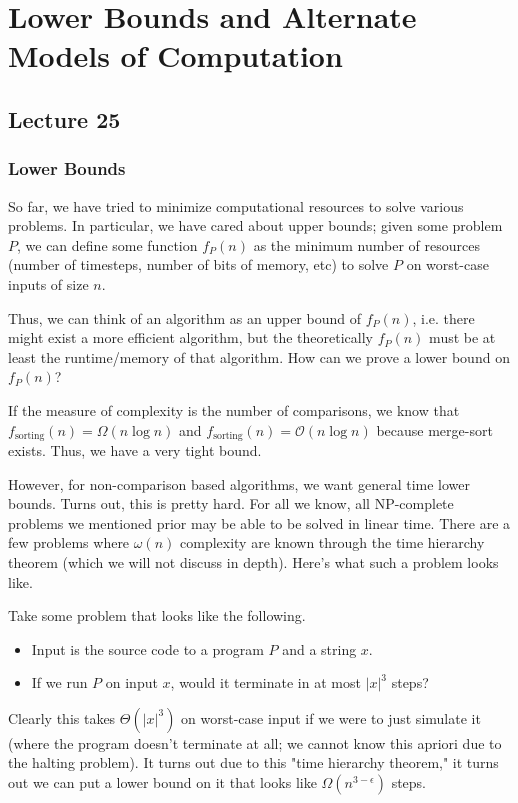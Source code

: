 \section{Lower Bounds and Alternate Models of Computation}
\subsection{Lecture 25}
\subsubsection{Lower Bounds}

So far, we have tried to minimize computational resources to solve various problems.
In particular, we have cared about upper bounds; given some problem $P$, we can define some function $f_P(n)$
as the minimum number of resources (number of timesteps, number of bits of memory, etc) to solve $P$ on worst-case inputs of size $n$.

Thus, we can think of an algorithm as an upper bound of $f_P(n)$, i.e. there might exist a more efficient algorithm,
but the theoretically $f_P(n)$ must be at least the runtime/memory of that algorithm. How can we prove a lower bound on $f_P(n)$?

If the measure of complexity is the number of comparisons, we know that $f_{\text{sorting}}(n) = \Omega(n \log n)$
and $f_{\text{sorting}}(n) = \mathcal{O}(n \log n)$ because merge-sort exists. Thus, we have a very tight bound.

However, for non-comparison based algorithms, we want general time lower bounds. Turns out, this is pretty hard. For all we know, all NP-complete problems we mentioned prior may be able to be solved in linear time.
There are a few problems where $\omega(n)$ complexity are known through the time hierarchy theorem (which we will not discuss in depth). Here's what such a problem looks like.

\begin{example}
    Take some problem that looks like the following.
    \begin{itemize}
        \item Input is the source code to a program $P$ and a string $x$.
        \item If we run $P$ on input $x$, would it terminate in at most $|x|^3$ steps?
    \end{itemize}
    Clearly this takes $\Theta(|x|^3)$ on worst-case input if we were to just simulate it (where the program doesn't terminate at all; we cannot know this apriori due to the halting problem).
    It turns out due to this "time hierarchy theorem," it turns out we can put a lower bound on it that looks like $\Omega(n^{3 - \epsilon})$ steps.
\end{example}

